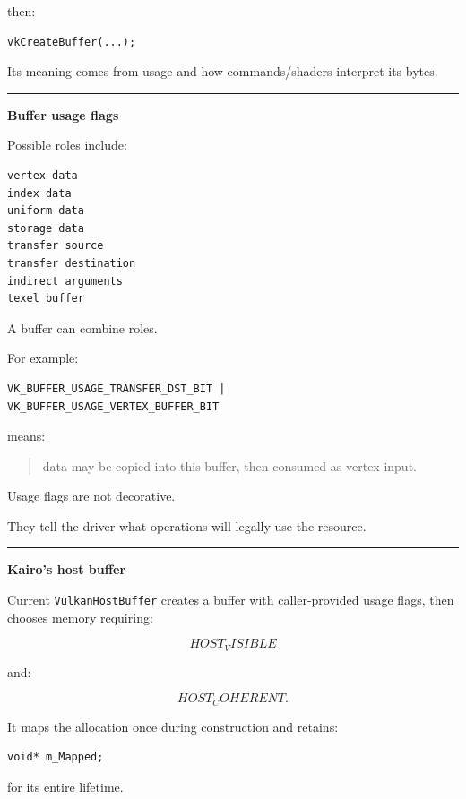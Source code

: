 then:

\begin{verbatim}
vkCreateBuffer(...);
\end{verbatim}

Its meaning comes from usage and how commands/shaders interpret its bytes.

\begin{center}\rule{0.5\linewidth}{0.5pt}\end{center}

\textbf{Buffer usage flags}

Possible roles include:

\begin{verbatim}
vertex data
index data
uniform data
storage data
transfer source
transfer destination
indirect arguments
texel buffer
\end{verbatim}

A buffer can combine roles.

For example:

\begin{verbatim}
VK_BUFFER_USAGE_TRANSFER_DST_BIT |
VK_BUFFER_USAGE_VERTEX_BUFFER_BIT
\end{verbatim}

means:

\begin{quote}
data may be copied into this buffer, then consumed as vertex input.
\end{quote}

Usage flags are not decorative.

They tell the driver what operations will legally use the resource.

\begin{center}\rule{0.5\linewidth}{0.5pt}\end{center}

\textbf{Kairo's host buffer}

Current \texttt{VulkanHostBuffer} creates a buffer with caller-provided usage flags, then chooses memory requiring:

\[
HOST_VISIBLE
\]

and:

\[
HOST_COHERENT.
\]

It maps the allocation once during construction and retains:

\begin{verbatim}
void* m_Mapped;
\end{verbatim}

for its entire lifetime.

